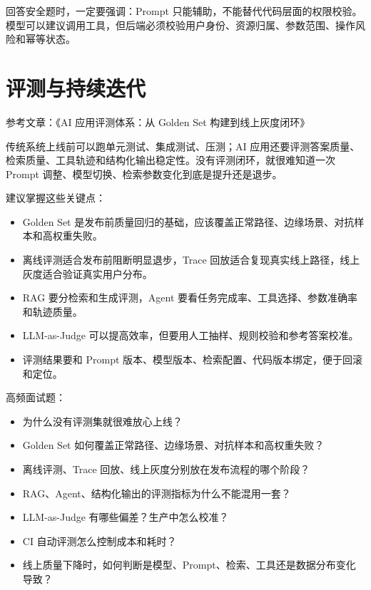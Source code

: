 \documentclass[10pt,a4paper]{ctexart}
\begin{document}
回答安全题时，一定要强调：Prompt 只能辅助，不能替代代码层面的权限校验。模型可以建议调用工具，但后端必须校验用户身份、资源归属、参数范围、操作风险和幂等状态。



\section{评测与持续迭代}


参考文章：《AI 应用评测体系：从 Golden Set 构建到线上灰度闭环》



传统系统上线前可以跑单元测试、集成测试、压测；AI 应用还要评测答案质量、检索质量、工具轨迹和结构化输出稳定性。没有评测闭环，就很难知道一次 Prompt 调整、模型切换、检索参数变化到底是提升还是退步。



建议掌握这些关键点：


\begin{itemize}[itemsep=2pt, topsep=4pt]
  \item Golden Set 是发布前质量回归的基础，应该覆盖正常路径、边缘场景、对抗样本和高权重失败。
  \item 离线评测适合发布前阻断明显退步，Trace 回放适合复现真实线上路径，线上灰度适合验证真实用户分布。
  \item RAG 要分检索和生成评测，Agent 要看任务完成率、工具选择、参数准确率和轨迹质量。
  \item LLM-as-Judge 可以提高效率，但要用人工抽样、规则校验和参考答案校准。
  \item 评测结果要和 Prompt 版本、模型版本、检索配置、代码版本绑定，便于回滚和定位。
\end{itemize}


高频面试题：


\begin{itemize}[itemsep=2pt, topsep=4pt]
  \item 为什么没有评测集就很难放心上线？
  \item Golden Set 如何覆盖正常路径、边缘场景、对抗样本和高权重失败？
  \item 离线评测、Trace 回放、线上灰度分别放在发布流程的哪个阶段？
  \item RAG、Agent、结构化输出的评测指标为什么不能混用一套？
  \item LLM-as-Judge 有哪些偏差？生产中怎么校准？
  \item CI 自动评测怎么控制成本和耗时？
  \item 线上质量下降时，如何判断是模型、Prompt、检索、工具还是数据分布变化导致？
\end{itemize}
\end{document}
